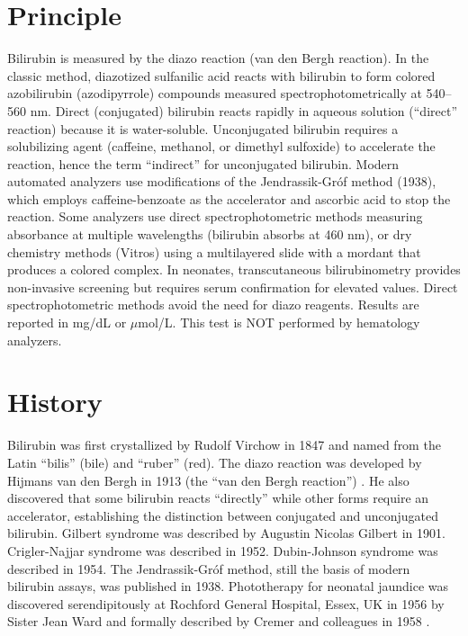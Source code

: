 \section*{Principle}
Bilirubin is measured by the diazo reaction (van den Bergh reaction). In the classic method, diazotized sulfanilic acid reacts with bilirubin to form colored azobilirubin (azodipyrrole) compounds measured spectrophotometrically at 540--560 nm. Direct (conjugated) bilirubin reacts rapidly in aqueous solution (``direct'' reaction) because it is water-soluble. Unconjugated bilirubin requires a solubilizing agent (caffeine, methanol, or dimethyl sulfoxide) to accelerate the reaction, hence the term ``indirect'' for unconjugated bilirubin. Modern automated analyzers use modifications of the Jendrassik-Gr\'{o}f method (1938), which employs caffeine-benzoate as the accelerator and ascorbic acid to stop the reaction. Some analyzers use direct spectrophotometric methods measuring absorbance at multiple wavelengths (bilirubin absorbs at 460 nm), or dry chemistry methods (Vitros) using a multilayered slide with a mordant that produces a colored complex. In neonates, transcutaneous bilirubinometry provides non-invasive screening but requires serum confirmation for elevated values. Direct spectrophotometric methods avoid the need for diazo reagents. Results are reported in mg/dL or $\mu$mol/L. This test is NOT performed by hematology analyzers.

\section*{History}
Bilirubin was first crystallized by Rudolf Virchow in 1847 and named from the Latin ``bilis'' (bile) and ``ruber'' (red). The diazo reaction was developed by Hijmans van den Bergh in 1913 (the ``van den Bergh reaction'') \cite{vandenbergh1916uber}. He also discovered that some bilirubin reacts ``directly'' while other forms require an accelerator, establishing the distinction between conjugated and unconjugated bilirubin. Gilbert syndrome was described by Augustin Nicolas Gilbert in 1901. Crigler-Najjar syndrome was described in 1952. Dubin-Johnson syndrome was described in 1954. The Jendrassik-Gr\'{o}f method, still the basis of modern bilirubin assays, was published in 1938. Phototherapy for neonatal jaundice was discovered serendipitously at Rochford General Hospital, Essex, UK in 1956 by Sister Jean Ward and formally described by Cremer and colleagues in 1958 \cite{cremer1958influence}.

